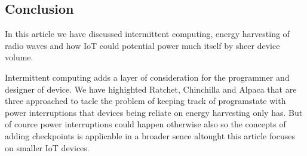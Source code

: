 \documentclass[article,a4paper]{IEEEtran}
\begin{document}
\subsection{Conclusion}
In this article we have discussed intermittent computing, energy harvesting of radio waves and how IoT could potential power much itself by sheer device volume.

Intermittent computing adds a layer of consideration for the programmer and designer of device. We have highighted Ratchet, Chinchilla and Alpaca that are three approached to tacle the problem of keeping track of programstate with power interruptions that devices being reliate on energy harvesting only has. But of cource power interruptions could happen otherwise also so the concepts of adding checkpoints is applicable in a broader sence altought this article focuses on smaller IoT devices. 
\printbibliography
\end{document}

